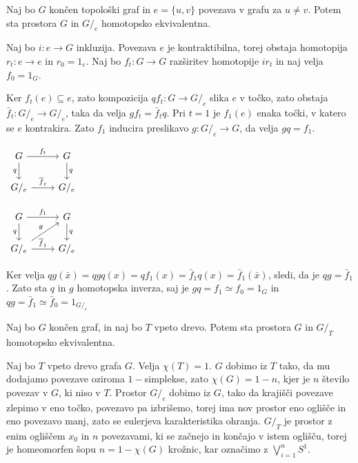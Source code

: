 \documentclass[mat1]{fmfdelo}
\begin{document}
\begin{trditev}
    Naj bo $G$ končen topološki graf in  $e=\{u,v\}$ povezava v grafu za $u\neq v$. Potem sta prostora $G$ in $G/_e$ homotopsko ekvivalentna.
\end{trditev}

\begin{dokaz}
    Naj bo $i:e\rightarrow G$ inkluzija. Povezava $e$ je kontraktibilna, torej obstaja homotopija $r_t:e \rightarrow e$ in $r_0=1_e$. Naj bo $f_t:G\rightarrow G$ razširitev homotopije $ir_t$ in naj velja $f_0=1_G$.

    Ker $f_t(e)\subseteq e$, zato kompozicija $qf_t:G\rightarrow G/_e$ slika $e$ v točko, zato obstaja $\bar{f}_t:G/_e\rightarrow G/_e$, taka da velja $gf_t=\bar{f}_tq$. Pri $t=1$ je $f_1(e)$ enaka točki, v katero se $e$ kontrakira. Zato $f_1$ inducira preslikavo $g:G/_e \rightarrow G$, da velja $gq=f_1$.
    \begin{minipage}{0.4\textwidth}
        \centering
        $\begin{tikzcd}
            {G}\arrow{r}{f_t} \arrow[swap]{d}{q} & {G} \arrow{d}{q} \\
            G/_e \arrow{r}{\overline{f}_t} & G/_e
        \end{tikzcd}
        $
    \end{minipage}
    \begin{minipage}{0.4\textwidth}
        \centering
        $\begin{tikzcd}
            {G}\arrow{r}{f_1} \arrow[swap]{d}{q} & {G} \arrow{d}{q} \\
            G/_e \arrow{ru}{g} \arrow{r}{\overline{f}_1} & G/_e
        \end{tikzcd}
        $
    \end{minipage}
    
    Ker velja $qg(\bar{x})=qgq(x)=qf_1(x)=\bar{f}_1 q(x)=\bar{f}_1(\bar{x})$, sledi, da je $qg=\bar{f}_1$. Zato sta $q$ in $g$ homotopska inverza, saj je $gq=f_1\simeq f_0=1_G$ in $qg=\bar{f}_1\simeq \bar{f}_0 = 1_{G/_e}$
\end{dokaz}

\begin{posledica}
    Naj bo $G$ končen graf, in naj bo $T$ vpeto drevo. Potem sta 
    prostora $G$ in $G/_T$ homotopsko ekvivalentna.
\end{posledica}

Naj bo $T$ vpeto drevo grafa $G$. Velja $\chi(T)=1$. $G$ dobimo iz $T$ tako, da mu dodajamo povezave 
oziroma $1-$simplekse, zato $\chi(G)=1-n$, kjer je $n$ število povezav v $G$, ki niso v 
$T$. Prostor $G/_e$ dobimo iz $G$, tako da krajišči povezave zlepimo v eno točko, povezavo pa 
izbrišemo, torej ima nov prostor eno oglišče in eno povezavo manj, zato se eulerjeva karakteristika 
ohranja. $G/_T$ je prostor z enim ogliščem $x_0$ in $n$ povezavami, ki se začnejo in končajo v istem 
oglišču, torej je homeomorfen šopu $n=1-\chi(G)$ krožnic, kar označimo z $\bigvee\limits_{i=1}^{n}S^1$.
\end{document}
